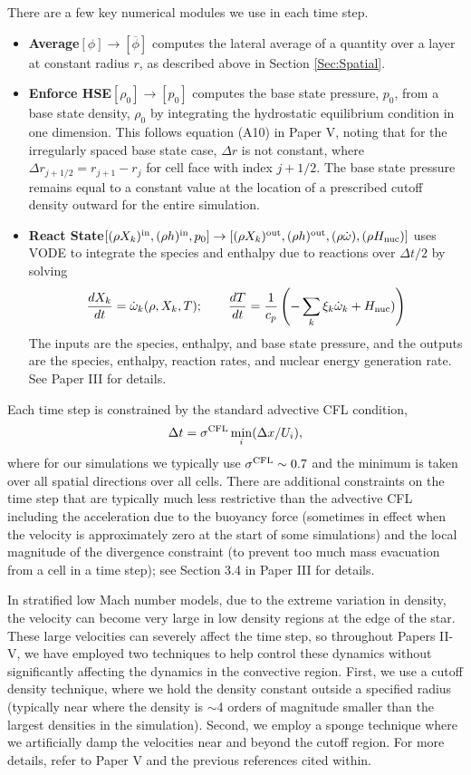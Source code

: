 \documentclass{aastex62}
\newcommand{\Hnuc}{H_{\rm nuc}}
\begin{document}
There are a few key numerical modules we use in each time step.
\begin{itemize}
\item {\bf Average}$[\phi]\rightarrow[\overline\phi]$ computes the lateral average of a quantity over a layer at constant radius $r$, as described above in Section \ref{Sec:Spatial}.
\item {\bf Enforce HSE}$[\rho_0]\rightarrow[p_0]$ computes the base state pressure, $p_0$, from a base state density, $\rho_0$ by integrating the hydrostatic equilibrium condition in one dimension. 
This follows equation (A10) in Paper V, noting that for the irregularly spaced base state case, $\Delta r$ is not constant, where $\Delta r_{j+1/2} = r_{j+1} - r_j$ for cell face with index $j+1/2$.  
The base state pressure remains equal to a constant value at the location of a prescribed cutoff density outward for the entire simulation.
\item {\bf React State}$[(\rho X_k)^{\rm in},(\rho h)^{\rm in},p_0]\rightarrow[(\rho X_k)^{\rm out},(\rho h)^{\rm out},(\rho\dot\omega),(\rho\Hnuc)]$ 
uses VODE \citep{vode} to integrate the species and enthalpy due to reactions over $\Delta t/2$ by solving
\begin{equation}
\frac{dX_k}{dt} = \dot\omega_k(\rho,X_k,T); \qquad
\frac{dT}{dt} = \frac{1}{c_p}\left(-\sum_k\xi_k\dot\omega_k + H_{\rm nuc})\right)
\end{equation}
The inputs are the species, enthalpy, and base state pressure, and the outputs are the species, enthalpy, reaction rates, and nuclear energy generation rate.
See Paper III for details.
\end{itemize}
Each time step is constrained by the standard advective CFL condition,
\begin{equation}
\Delta t = \sigma^{\rm CFL} \min_i(\Delta x / U_i),
\end{equation}
where for our simulations we typically use $\sigma^{\rm CFL}\sim 0.7$ and the minimum is taken over all spatial directions over all cells.
There are additional constraints on the time step that are typically much less restrictive than the advective CFL including
the acceleration due to the buoyancy force (sometimes in effect when the velocity is approximately zero at the start of some simulations) 
and the local magnitude of the divergence constraint (to prevent too much mass evacuation from a cell in a time step); see Section 3.4 in Paper III for details.

In stratified low Mach number models, due to the extreme variation in density, the velocity can become very large in low density regions at the edge of the star.
These large velocities can severely affect the time step, so
throughout Papers II-V, we have employed two techniques to help control these dynamics without significantly 
affecting the dynamics in the convective region.
First, we use a cutoff density technique, where we hold the density constant outside a specified radius (typically near where the density is $\sim$4 orders of magnitude smaller than the largest densities in the simulation).
Second, we employ a sponge technique where we artificially damp the velocities near and beyond the cutoff region.
For more details, refer to Paper V and the previous references cited within.
\end{document}
